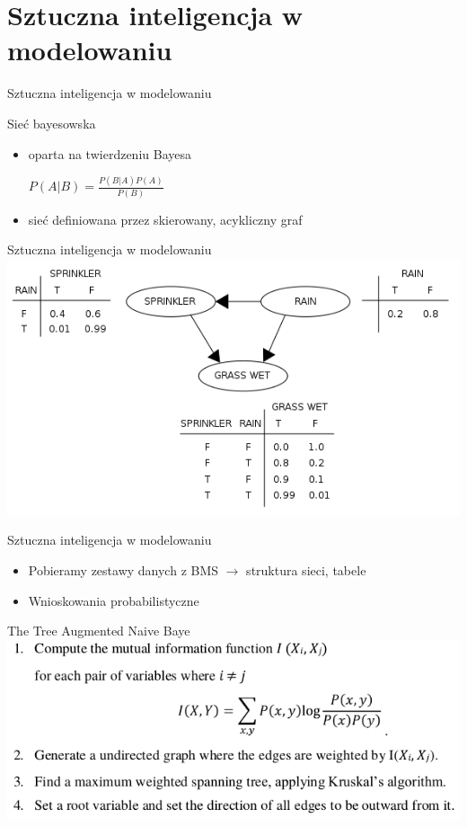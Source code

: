 \documentclass[10pt]{beamer}
\begin{document}
\section{Sztuczna inteligencja w modelowaniu}

\begin{frame}{Sztuczna inteligencja w modelowaniu}

\begin{block}{Sieć bayesowska}
\begin{itemize}
\item oparta na twierdzeniu Bayesa \\\begin{center}
$P(A|B)=\frac{P(B|A)P(A)}{P(B)}$
\end{center} 
\item sieć definiowana przez skierowany, acykliczny graf
\end{itemize}
\end{block}

\end{frame}

\begin{frame}{Sztuczna inteligencja w modelowaniu}
\includegraphics[scale=0.5]{bayes.png}
\end{frame}

\begin{frame}{Sztuczna inteligencja w modelowaniu}
\begin{itemize}
\item Pobieramy zestawy danych z BMS $\rightarrow$ struktura sieci, tabele
\item Wnioskowania probabilistyczne
\end{itemize}
\end{frame}



\begin{frame}{The Tree Augmented Naive Baye}
\includegraphics[scale=0.5]{TAN.png}
\end{frame}
\end{document}
